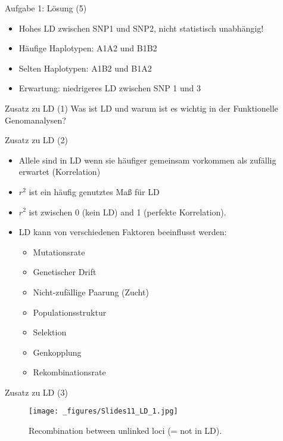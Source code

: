\documentclass{beamer}
\begin{document}
\begin{frame}{Aufgabe 1: Lösung (5)}
\begin{itemize}
    \item Hohes LD zwischen SNP1 und SNP2, nicht statistisch unabhängig! 
    \item Häufige Haplotypen: A1A2 und B1B2
    \item Selten Haplotypen: A1B2 und B1A2
    \item Erwartung: niedrigeres LD zwischen SNP 1 und 3
\end{itemize}
\end{frame}

\begin{frame}{Zusatz zu LD (1)}
Was ist LD und warum ist es wichtig in der Funktionelle Genomanalysen? 
\end{frame}

\begin{frame}{Zusatz zu LD (2)}
\begin{itemize}
    \item Allele sind in LD wenn sie häufiger gemeinsam vorkommen als zufällig erwartet (Korrelation)
    \item $r^2$ ist ein häufig genutztes Maß für LD 
    \item $r^2$ ist zwischen 0 (kein LD) and 1 (perfekte Korrelation).
    \item LD kann von verschiedenen Faktoren beeinflusst werden: 
    \begin{itemize}
        \item Mutationsrate
        \item Genetischer Drift
        \item Nicht-zufällige Paarung (Zucht)
        \item Populationsstruktur
        \item Selektion
        \item Genkopplung
        \item Rekombinationsrate
    \end{itemize}
\end{itemize}
\end{frame}

\begin{frame}{Zusatz zu LD (3)}
\begin{figure}[h]
\begin{center}
\texttt{[image: \_figures/Slides11\_LD\_1.jpg]}
\caption{Recombination between unlinked loci (= not in LD).}
\label{fig:LD1}
\end{center}
\end{figure}
\end{frame}
\end{document}
